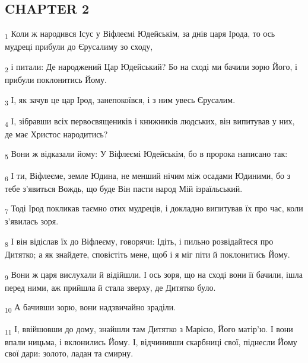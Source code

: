 \subsection{CHAPTER 2}
\begin{tcolorbox}
\textsubscript{1} Коли ж народився Ісус у Віфлеємі Юдейськім, за днів царя Ірода, то ось мудреці прибули до Єрусалиму зо сходу,
\end{tcolorbox}
\begin{tcolorbox}
\textsubscript{2} і питали: Де народжений Цар Юдейський? Бо на сході ми бачили зорю Його, і прибули поклонитись Йому.
\end{tcolorbox}
\begin{tcolorbox}
\textsubscript{3} І, як зачув це цар Ірод, занепокоївся, і з ним увесь Єрусалим.
\end{tcolorbox}
\begin{tcolorbox}
\textsubscript{4} І, зібравши всіх первосвящеників і книжників людських, він випитував у них, де має Христос народитись?
\end{tcolorbox}
\begin{tcolorbox}
\textsubscript{5} Вони ж відказали йому: У Віфлеємі Юдейськім, бо в пророка написано так:
\end{tcolorbox}
\begin{tcolorbox}
\textsubscript{6} І ти, Віфлеєме, земле Юдина, не менший нічим між осадами Юдиними, бо з тебе з'явиться Вождь, що буде Він пасти народ Мій ізраїльський.
\end{tcolorbox}
\begin{tcolorbox}
\textsubscript{7} Тоді Ірод покликав таємно отих мудреців, і докладно випитував їх про час, коли з'явилась зоря.
\end{tcolorbox}
\begin{tcolorbox}
\textsubscript{8} І він відіслав їх до Віфлеєму, говорячи: Ідіть, і пильно розвідайтеся про Дитятко; а як знайдете, сповістіть мене, щоб і я міг піти й поклонитись Йому.
\end{tcolorbox}
\begin{tcolorbox}
\textsubscript{9} Вони ж царя вислухали й відійшли. І ось зоря, що на сході вони її бачили, ішла перед ними, аж прийшла й стала зверху, де Дитятко було.
\end{tcolorbox}
\begin{tcolorbox}
\textsubscript{10} А бачивши зорю, вони надзвичайно зраділи.
\end{tcolorbox}
\begin{tcolorbox}
\textsubscript{11} І, ввійшовши до дому, знайшли там Дитятко з Марією, Його матір'ю. І вони впали ницьма, і вклонились Йому. І, відчинивши скарбниці свої, піднесли Йому свої дари: золото, ладан та смирну.
\end{tcolorbox}
